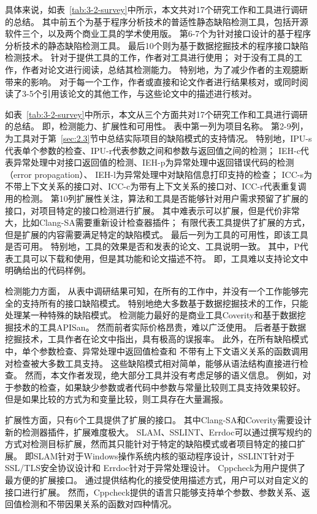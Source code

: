 具体来说，如表~\ref{tab:3-2-survey}中所示，本文共对17个研究工作和工具进行调研的总结。
其中前五个为基于程序分析技术的普适性静态缺陷检测工具，包括开源软件三个，以及两个商业工具的学术使用版。
第6-7个为针对接口设计的基于程序分析技术的静态缺陷检测工具。
最后10个则为基于数据挖掘技术的程序接口缺陷检测技术。
针对于提供工具的工作，作者对工具进行使用；
对于没有工具的工作，作者对论文进行阅读，总结其检测能力。
特别地，为了减少作者的主观臆断带来的影响。
对于每一个工作，作者或直接和论文作者进行结果核对，或同时阅读了3-5个引用该论文的其他工作，与这些论文中的描述进行核对。


如表~\ref{tab:3-2-survey}中所示，本文从三个方面共对17个研究工作和工具进行调研的总结。
即，检测能力、扩展性和可用性。
表中第一列为项目名称。
第2-9列，为工具对于第~\ref{sec:2.3}节中总结实际项目的缺陷模式的支持情况。
特别地，IPU-s代表单个参数的检查、IPU-r代表参数之间和参数与返回值之间的检测；
IEH-c代表异常处理中对接口返回值的检测、IEH-p为异常处理中返回错误代码的检测（error propagation）、
IEH-l为异常处理中对缺陷信息打印支持的检查；
ICC-s为不带上下文关系的接口对、ICC-c为带有上下文关系的接口对、ICC-r代表重复调用的检测。
第10列扩展性关注，算法和工具是否能够针对用户需求预留了扩展的接口，对项目特定的接口检测进行扩展。
其中难表示可以扩展，但是代价非常大，比如Clang-SA需要重新设计检查器插件；
有限代表工具提供了扩展的方式，但是扩展的内容需要满足特定的缺陷模式。
最后一列为工具的可用性，即该工具是否可用。
特别地，工具的效果是否和发表的论文、工具说明一致。
其中，P代表工具可以下载和使用，但是其功能和论文描述不符。
即，工具难以支持论文中明确给出的代码样例。

检测能力方面，
从表中调研结果可知，在所有的工作中，并没有一个工作能够完全的支持所有的接口缺陷模式。
特别地绝大多数基于数据挖掘技术的工作，只能处理某一种特殊的缺陷模式。
检测能力最好的是商业工具Coverity和基于数据挖掘技术的工具APISan。
然而前者实际价格昂贵，难以广泛使用。
后者基于数据挖掘技术，工具作者在论文中指出，具有极高的误报率。
此外，在所有缺陷模式中，单个参数检查、异常处理中返回值检查和
不带有上下文语义关系的函数调用对检查被大多数工具支持。
这些缺陷模式相对简单，能够从语法结构直接进行检查。
然而，本文作者发现，绝大部分工具并没有考虑足够的语义信息。
例如，对于参数的检查，如果缺少参数或者代码中参数与常量比较则工具支持效果较好。
但是如果比较的方式为和变量比较，则工具存在大量漏报。

扩展性方面，只有6个工具提供了扩展的接口。
其中Clang-SA和Coverity需要设计新的检测器插件，扩展难度极大。
SLAM、SSLINT、Errdoc可以通过撰写规约的方式对检测目标扩展，然而其只能针对于特定的缺陷模式或者项目特定的接口扩展。
即SLAM针对于Windows操作系统内核的驱动程序设计，SSLINT针对于SSL/TLS安全协议设计和
Errdoc针对于异常处理设计。
Cppcheck为用户提供了最方便的扩展接口。
通过提供结构化的接受使用描述方式，用户可以对自定义的接口进行扩展。
然而，Cppcheck提供的语言只能够支持单个参数、参数关系、返回值检测和不带因果关系的函数对四种情况。

